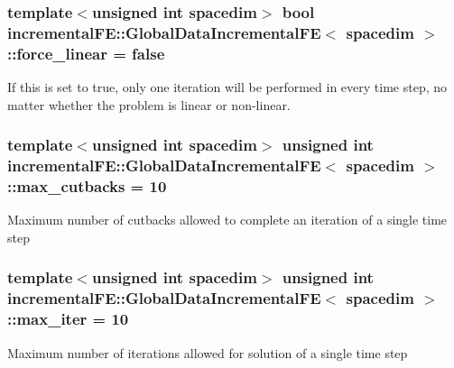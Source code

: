 \subsubsection[{\texorpdfstring{force\+\_\+linear}{force_linear}}]{\setlength{\rightskip}{0pt plus 5cm}template$<$unsigned int spacedim$>$ bool {\bf incremental\+F\+E\+::\+Global\+Data\+Incremental\+FE}$<$ spacedim $>$\+::force\+\_\+linear = false\hspace{0.3cm}{\ttfamily [private]}}\hypertarget{classincremental_f_e_1_1_global_data_incremental_f_e_a37c1d42902e74f13f3c4ba82d2dabd67}{}\label{classincremental_f_e_1_1_global_data_incremental_f_e_a37c1d42902e74f13f3c4ba82d2dabd67}
If this is set to {\ttfamily true}, only one iteration will be performed in every time step, no matter whether the problem is linear or non-\/linear. 
\subsubsection[{\texorpdfstring{max\+\_\+cutbacks}{max_cutbacks}}]{\setlength{\rightskip}{0pt plus 5cm}template$<$unsigned int spacedim$>$ unsigned int {\bf incremental\+F\+E\+::\+Global\+Data\+Incremental\+FE}$<$ spacedim $>$\+::max\+\_\+cutbacks = 10\hspace{0.3cm}{\ttfamily [private]}}\hypertarget{classincremental_f_e_1_1_global_data_incremental_f_e_a7ae58573e9cc241a14976bf19351ba63}{}\label{classincremental_f_e_1_1_global_data_incremental_f_e_a7ae58573e9cc241a14976bf19351ba63}
Maximum number of cutbacks allowed to complete an iteration of a single time step 
\subsubsection[{\texorpdfstring{max\+\_\+iter}{max_iter}}]{\setlength{\rightskip}{0pt plus 5cm}template$<$unsigned int spacedim$>$ unsigned int {\bf incremental\+F\+E\+::\+Global\+Data\+Incremental\+FE}$<$ spacedim $>$\+::max\+\_\+iter = 10\hspace{0.3cm}{\ttfamily [private]}}\hypertarget{classincremental_f_e_1_1_global_data_incremental_f_e_ad15c334652b6a9d6843c360c6e2005ec}{}\label{classincremental_f_e_1_1_global_data_incremental_f_e_ad15c334652b6a9d6843c360c6e2005ec}
Maximum number of iterations allowed for solution of a single time step 
